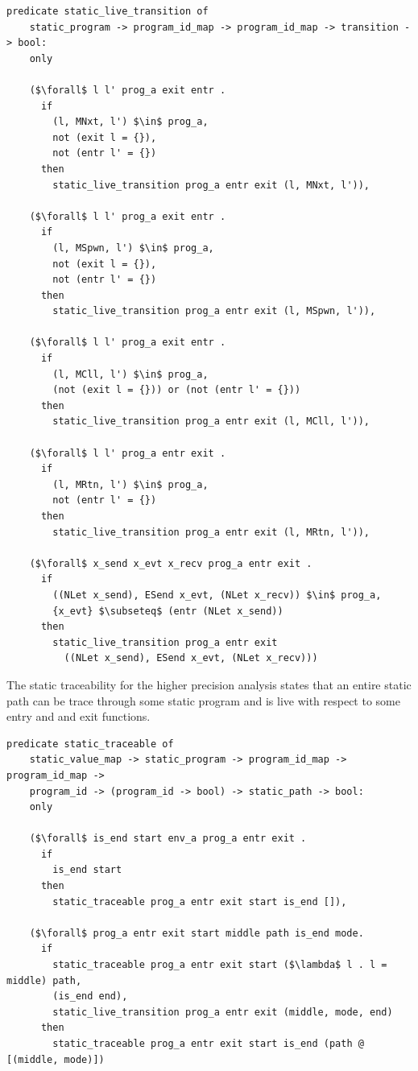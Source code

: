 \documentclass{article}
\begin{document}
\begin{lstlisting}[language=logic, mathescape]
  predicate static_live_transition of
    static_program -> program_id_map -> program_id_map -> transition -> bool:
    only

    ($\forall$ l l' prog_a exit entr . 
      if
        (l, MNxt, l') $\in$ prog_a,
        not (exit l = {}),
        not (entr l' = {})
      then
        static_live_transition prog_a entr exit (l, MNxt, l')),

    ($\forall$ l l' prog_a exit entr .
      if
        (l, MSpwn, l') $\in$ prog_a, 
        not (exit l = {}),
        not (entr l' = {})
      then
        static_live_transition prog_a entr exit (l, MSpwn, l')),

    ($\forall$ l l' prog_a exit entr .
      if
        (l, MCll, l') $\in$ prog_a,
        (not (exit l = {})) or (not (entr l' = {}))
      then
        static_live_transition prog_a entr exit (l, MCll, l')),

    ($\forall$ l l' prog_a entr exit .
      if
        (l, MRtn, l') $\in$ prog_a,
        not (entr l' = {})
      then
        static_live_transition prog_a entr exit (l, MRtn, l')),

    ($\forall$ x_send x_evt x_recv prog_a entr exit .
      if
        ((NLet x_send), ESend x_evt, (NLet x_recv)) $\in$ prog_a, 
        {x_evt} $\subseteq$ (entr (NLet x_send))
      then
        static_live_transition prog_a entr exit
          ((NLet x_send), ESend x_evt, (NLet x_recv)))
  \end{lstlisting}

The static traceability for the higher precision analysis states
that an entire static path can be trace through some static program and
is live with respect to some entry and and exit functions.

\begin{lstlisting}[language=logic, mathescape]
  predicate static_traceable of
    static_value_map -> static_program -> program_id_map -> program_id_map ->
    program_id -> (program_id -> bool) -> static_path -> bool:
    only

    ($\forall$ is_end start env_a prog_a entr exit .
      if
        is_end start
      then
        static_traceable prog_a entr exit start is_end []),

    ($\forall$ prog_a entr exit start middle path is_end mode. 
      if
        static_traceable prog_a entr exit start ($\lambda$ l . l = middle) path, 
        (is_end end),
        static_live_transition prog_a entr exit (middle, mode, end) 
      then
        static_traceable prog_a entr exit start is_end (path @ [(middle, mode)])
  \end{lstlisting}
\end{document}
